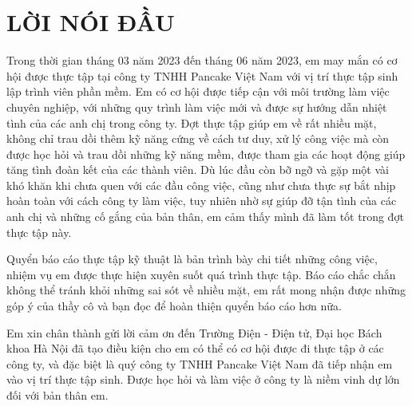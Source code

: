 \section*{LỜI NÓI ĐẦU} %
\thispagestyle{empty}

Trong thời gian tháng 03 năm 2023 đến tháng 06 năm 2023, em may mắn có cơ hội được thực tập tại công ty TNHH Pancake Việt Nam
với vị trí thực tập sinh lập trình viên phần mềm. Em có cơ hội được tiếp cận với môi trường làm việc chuyên nghiệp, với
những quy trình làm việc mới và được sự hướng dẫn nhiệt tình của các anh chị trong công ty. Đợt thực tập giúp em
về rất nhiều mặt, không chỉ trau dồi thêm kỹ năng cứng về cách tư duy, xử lý công việc mà còn được học hỏi và trau dồi
những kỹ năng mềm, được tham gia các hoạt động giúp tăng tình đoàn kết của các thành viên. Dù lúc đầu còn bỡ ngỡ và
gặp một vài khó khăn khi chưa quen với các đầu công việc, cũng như chưa thực sự bắt nhịp hoàn toàn với cách công ty
làm việc, tuy nhiên nhờ sự giúp đỡ tận tình của các anh chị và những cố gắng của bản thân, em cảm thấy mình đã làm tốt
trong đợt thực tập này.

Quyển báo cáo thực tập kỹ thuật là bản trình bày chi tiết những công việc, nhiệm vụ em được thực hiện xuyên suốt quá trình
thực tập. Báo cáo chắc chắn không thể tránh khỏi những sai sót về nhiều mặt, em rất mong nhận được những góp ý của thầy
cô và bạn đọc để hoàn thiện quyển báo cáo hơn nữa.

Em xin chân thành gửi lời cảm ơn đến Trường Điện - Điện tử, Đại học Bách khoa Hà Nội đã tạo điều kiện cho em có thể có cơ
hội được đi thực tập ở các công ty, và đặc biệt là quý công ty TNHH Pancake Việt Nam đã tiếp nhận em vào vị trí thực
tập sinh. Được học hỏi và làm việc ở công ty là niềm vinh dự lớn đối với bản thân em.

\cleardoublepage
